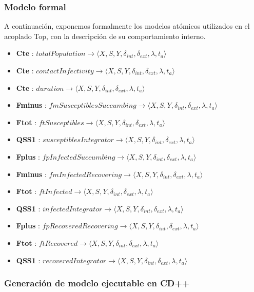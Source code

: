 \subsubsection{Modelo formal}
A continuación, exponemos formalmente los modelos atómicos utilizados en el acoplado Top, con la descripción de su comportamiento interno.
\begin{itemize}
\item \textbf{Cte} : $ totalPopulation \rightarrow \langle X, S, Y, \delta_{int}, \delta_{ext}, \lambda, t_{a} \rangle$
\item \textbf{Cte} : $ contactInfectivity \rightarrow \langle X, S, Y, \delta_{int}, \delta_{ext}, \lambda, t_{a} \rangle$
\item \textbf{Cte} : $ duration \rightarrow \langle X, S, Y, \delta_{int}, \delta_{ext}, \lambda, t_{a} \rangle$
\item \textbf{Fminus} : $ fmSusceptiblesSuccumbing \rightarrow \langle X, S, Y, \delta_{int}, \delta_{ext}, \lambda, t_{a} \rangle$
\item \textbf{Ftot} : $ ftSusceptibles \rightarrow \langle X, S, Y, \delta_{int}, \delta_{ext}, \lambda, t_{a} \rangle$
\item \textbf{QSS1} : $ susceptiblesIntegrator \rightarrow \langle X, S, Y, \delta_{int}, \delta_{ext}, \lambda, t_{a} \rangle$
\item \textbf{Fplus} : $ fpInfectedSuccumbing \rightarrow \langle X, S, Y, \delta_{int}, \delta_{ext}, \lambda, t_{a} \rangle$
\item \textbf{Fminus} : $ fmInfectedRecovering \rightarrow \langle X, S, Y, \delta_{int}, \delta_{ext}, \lambda, t_{a} \rangle$
\item \textbf{Ftot} : $ ftInfected \rightarrow \langle X, S, Y, \delta_{int}, \delta_{ext}, \lambda, t_{a} \rangle$
\item \textbf{QSS1} : $ infectedIntegrator \rightarrow \langle X, S, Y, \delta_{int}, \delta_{ext}, \lambda, t_{a} \rangle$
\item \textbf{Fplus} : $ fpRecoveredRecovering \rightarrow \langle X, S, Y, \delta_{int}, \delta_{ext}, \lambda, t_{a} \rangle$
\item \textbf{Ftot} : $ ftRecovered \rightarrow \langle X, S, Y, \delta_{int}, \delta_{ext}, \lambda, t_{a} \rangle$
\item \textbf{QSS1} : $ recoveredIntegrator \rightarrow \langle X, S, Y, \delta_{int}, \delta_{ext}, \lambda, t_{a} \rangle$
\end{itemize}

\subsubsection{Generación de modelo ejecutable en CD++}
